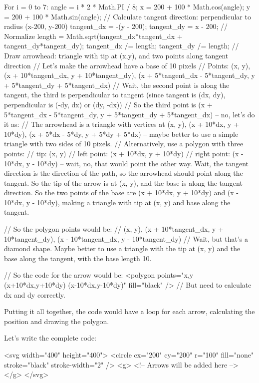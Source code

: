 For i = 0 to 7:
  angle = i * 2 * Math.PI / 8;
  x = 200 + 100 * Math.cos(angle);
  y = 200 + 100 * Math.sin(angle);
  // Calculate tangent direction: perpendicular to radius (x-200, y-200)
  tangent_dx = -(y - 200);
  tangent_dy = x - 200;
  // Normalize
  length = Math.sqrt(tangent_dx*tangent_dx + tangent_dy*tangent_dy);
  tangent_dx /= length;
  tangent_dy /= length;
  // Draw arrowhead: triangle with tip at (x,y), and two points along tangent direction
  // Let's make the arrowhead have a base of 10 pixels
  // Points: (x, y), (x + 10*tangent_dx, y + 10*tangent_dy), (x + 5*tangent_dx - 5*tangent_dy, y + 5*tangent_dy + 5*tangent_dx)
  // Wait, the second point is along the tangent, the third is perpendicular to tangent (since tangent is (dx, dy), perpendicular is (-dy, dx) or (dy, -dx))
  // So the third point is (x + 5*tangent_dx - 5*tangent_dy, y + 5*tangent_dy + 5*tangent_dx) – no, let's do it as:
  // The arrowhead is a triangle with vertices at (x, y), (x + 10*dx, y + 10*dy), (x + 5*dx - 5*dy, y + 5*dy + 5*dx) – maybe better to use a simple triangle with two sides of 10 pixels.
  // Alternatively, use a polygon with three points:
  // tip: (x, y)
  // left point: (x + 10*dx, y + 10*dy)
  // right point: (x - 10*dx, y - 10*dy) – wait, no, that would point the other way. Wait, the tangent direction is the direction of the path, so the arrowhead should point along the tangent. So the tip of the arrow is at (x, y), and the base is along the tangent direction. So the two points of the base are (x + 10*dx, y + 10*dy) and (x - 10*dx, y - 10*dy), making a triangle with tip at (x, y) and base along the tangent.

  // So the polygon points would be:
  // (x, y), (x + 10*tangent_dx, y + 10*tangent_dy), (x - 10*tangent_dx, y - 10*tangent_dy)
  // Wait, but that's a diamond shape. Maybe better to use a triangle with the tip at (x, y) and the base along the tangent, with the base length 10.

  // So the code for the arrow would be:
  <polygon points="x,y (x+10*dx,y+10*dy) (x-10*dx,y-10*dy)" fill="black" />
  // But need to calculate dx and dy correctly.

Putting it all together, the code would have a loop for each arrow, calculating the position and drawing the polygon.

Let's write the complete code:

<svg width="400" height="400">
  <circle cx="200" cy="200" r="100" fill="none" stroke="black" stroke-width="2" />
  <g>
    <!-- Arrows will be added here -->
  </g>
</svg>

